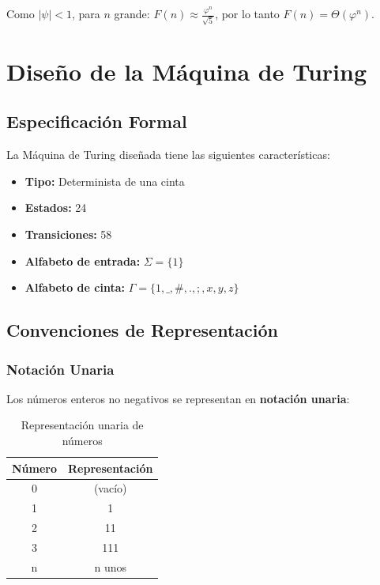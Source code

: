 \documentclass[12pt,a4paper]{article}
\begin{document}
Como $|\psi| < 1$, para $n$ grande: $F(n) \approx \frac{\varphi^n}{\sqrt{5}}$, por lo tanto $F(n) = \Theta(\varphi^n)$.

\newpage

\section{Diseño de la Máquina de Turing}

\subsection{Especificación Formal}

La Máquina de Turing diseñada tiene las siguientes características:

\begin{itemize}
    \item \textbf{Tipo:} Determinista de una cinta
    \item \textbf{Estados:} 24
    \item \textbf{Transiciones:} 58
    \item \textbf{Alfabeto de entrada:} $\Sigma = \{1\}$
    \item \textbf{Alfabeto de cinta:} $\Gamma = \{1, \_, \#, ., ;, x, y, z\}$
\end{itemize}

\subsection{Convenciones de Representación}

\subsubsection{Notación Unaria}

Los números enteros no negativos se representan en \textbf{notación unaria}:

\begin{table}[H]
\centering
\begin{tabular}{cc}
\toprule
\textbf{Número} & \textbf{Representación} \\
\midrule
0 & (vacío) \\
1 & 1 \\
2 & 11 \\
3 & 111 \\
n & n unos \\
\bottomrule
\end{tabular}
\caption{Representación unaria de números}
\end{table}
\end{document}
